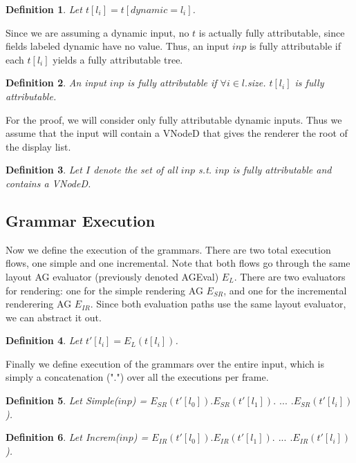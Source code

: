 \documentclass[11pt]{article}
\newtheorem{definition}{Definition}
\begin{document}
\begin{definition}
Let $t[l_i] = t[dynamic=l_i]$.
\end{definition}

Since we are assuming a dynamic input, no $t$ is actually fully attributable, since fields labeled dynamic have no value. Thus, an input $inp$ is fully attributable if each $t[l_i]$ yields a fully attributable tree.

\begin{definition}
An input $inp$ is fully attributable if $\forall i \in l.$size. $t[l_i]$ is fully attributable.
\end{definition}

For the proof, we will consider only fully attributable dynamic inputs. Thus we assume that the input will contain a VNodeD that gives the renderer the root of the display list.

\begin{definition}
Let $I$ denote the set of all $inp$ s.t. $inp$ is fully attributable and contains a VNodeD.
\end{definition}

\subsection{Grammar Execution}

Now we define the execution of the grammars. There are two total execution flows, one simple and one incremental. Note that both flows go through the same layout AG evaluator (previously denoted AGEval) $E_L$. There are two evaluators for rendering: one for the simple rendering AG $E_{SR}$, and one for the incremental renderering AG $E_{IR}$. Since both evaluation paths use the same layout evaluator, we can abstract it out.

\begin{definition}
Let $t'[l_i] = E_L(t[l_i])$.
\end{definition}

Finally we define execution of the grammars over the entire input, which is simply a concatenation (".") over all the executions per frame.
\begin{definition}
Let Simple($inp$) = $E_{SR}(t'[l_0]).E_{SR}(t'[l_1]).$ $...$ $.E_{SR}(t'[l_i])$).
\end{definition}
\begin{definition}
Let Increm($inp$) = $E_{IR}(t'[l_0]).E_{IR}(t'[l_1]).$ $...$ $.E_{IR}(t'[l_i])$).
\end{definition}
\end{document}
